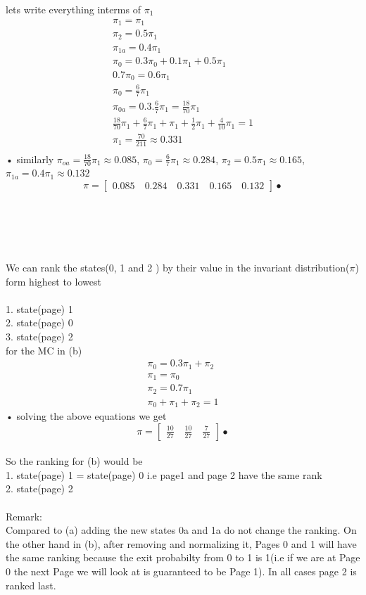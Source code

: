 \documentclass[a4paper,11pt]{report}
\begin{document}
lets write everything interms of $\pi_1$\\

\begin{eqnarray}
\pi_1=\pi_1\\
\pi_2=0.5\pi_1\\
\pi_{1a}=0.4\pi_1\\
\pi_0 = 0.3\pi_0 + 0.1\pi_1 + 0.5\pi_1\\
0.7\pi_0=0.6\pi_1\\
\pi_0 = \frac{6}{7}\pi_1\\
\pi_{0a} = 0.3.\frac{6}{7}\pi_1=\frac{18}{70}\pi_1\\
\frac{18}{70}\pi_1+\frac{6}{7}\pi_1+\pi_1+\frac{1}{2}\pi_1+\frac{4}{10}\pi_1 = 1\\
\pi_1 = \frac{70}{211}\approx 0.331\\
\end{eqnarray}•
similarly  $\pi_{oa} = \frac{18}{70}\pi_1\approx0.085$, $\pi_0=\frac{6}{7}\pi_1\approx0.284$, $\pi_2=0.5\pi_1\approx0.165$, $\pi_{1a}=0.4\pi_1\approx0.132$
$$
\pi = \begin{bmatrix}
0.085 \quad 0.284 \quad 0.331 \quad 0.165 \quad 0.132    
\end{bmatrix}•
$$
\\\\\\\\\\We can rank the states(0, 1  and 2 ) by their value in the invariant distribution($\pi$) form highest to lowest\\\\
1. state(page) 1\\
2. state(page) 0\\
3. state(page) 2\\


for the MC in (b)
\begin{eqnarray}
\pi_0  = 0.3\pi_1 + \pi_2\\
\pi_1  = \pi_0\\
\pi_2  = 0.7\pi_1\\
\pi_0+\pi_1+\pi_2=1
\end{eqnarray}•
solving the above equations we get\\
$$
\pi = \begin{bmatrix}
\frac{10}{27} \quad \frac{10}{27} \quad \frac{7}{27}    
\end{bmatrix}•
$$\\
So the ranking for (b) would be \\
1. state(page) 1 = state(page) 0 \quad i.e page1 and page 2 have the same rank\\
2. state(page) 2\\\\
Remark:\\
Compared to (a) adding the new states 0a and 1a do not change the ranking. On the other hand in (b), after removing and normalizing it, Pages 0 and 1 will have the same ranking because the exit probabilty  from 0 to 1 is 1(i.e if we are at Page 0 the next Page we will look at is guaranteed to be Page 1). In all cases page 2 is ranked last.
\end{document}

